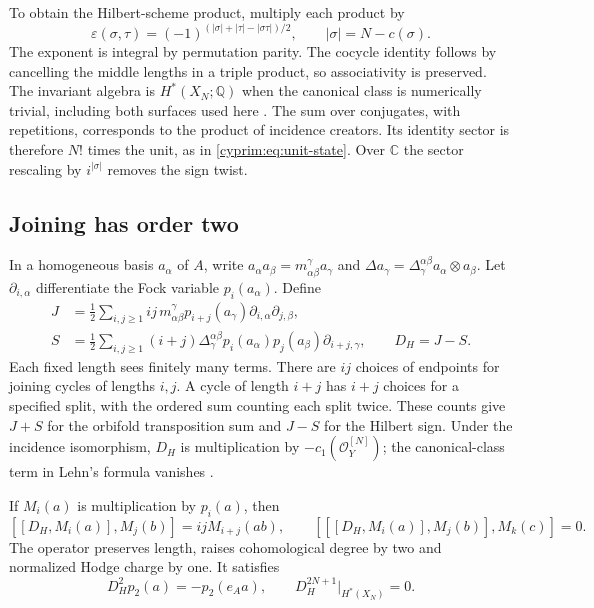 To obtain the Hilbert-scheme product, multiply each product
by
\begin{equation}\label{cyprim:eq:Hilbert-sign}
 \varepsilon(\sigma,\tau)
 =(-1)^{(|\sigma|+|\tau|-|\sigma\tau|)/2},
 \qquad |\sigma|=N-c(\sigma).
\end{equation}
The exponent is integral by permutation parity. The cocycle
identity follows by cancelling the middle lengths in a
triple product, so associativity is preserved.
The invariant algebra is $H^*(X_N;\mathbb Q)$ when the
canonical class is numerically trivial, including both
surfaces used here \cite[Theorem~3.2]{rewriteLS2003}.
The sum over conjugates, with repetitions, corresponds to
the product of incidence creators. Its identity sector is
therefore $N!$ times the unit, as in
\eqref{cyprim:eq:unit-state}. Over $\mathbb C$ the sector
rescaling by $i^{|\sigma|}$ removes the sign twist.

\subsection{Joining has order two}

In a homogeneous basis $a_\alpha$ of $A$, write
$a_\alpha a_\beta=m_{\alpha\beta}^{\gamma}a_\gamma$
and $\Delta a_\gamma=\Delta_\gamma^{\alpha\beta}
a_\alpha\otimes a_\beta$. Let $\partial_{i,\alpha}$
differentiate the Fock variable $p_i(a_\alpha)$. Define
\begin{equation}\label{cyprim:eq:join-split}
\begin{split}
 J&=\frac12\sum_{i,j\ge1}ij\,m_{\alpha\beta}^{\gamma}
       p_{i+j}(a_\gamma)\partial_{i,\alpha}\partial_{j,\beta},\\
 S&=\frac12\sum_{i,j\ge1}(i+j)\Delta_\gamma^{\alpha\beta}
       p_i(a_\alpha)p_j(a_\beta)\partial_{i+j,\gamma},
 \qquad D_H=J-S.
\end{split}
\end{equation}
Each fixed length sees finitely many terms. There are $ij$
choices of endpoints for joining cycles of lengths $i,j$.
A cycle of length $i+j$ has $i+j$ choices for a specified
split, with the ordered sum counting each split twice.
These counts give $J+S$ for the orbifold transposition
sum and $J-S$ for the Hilbert sign. Under the incidence
isomorphism, $D_H$ is multiplication by
$-c_1(\mathcal O_Y^{[N]})$; the canonical-class term in
Lehn's formula vanishes \cite[Theorem~3.10]{rewriteLehn1999}.

\begin{proposition}\label{cyprim:prop:joining}
If $M_i(a)$ is multiplication by $p_i(a)$, then
\[
 [[D_H,M_i(a)],M_j(b)]=ijM_{i+j}(ab),
 \qquad [[[D_H,M_i(a)],M_j(b)],M_k(c)]=0.
\]
The operator preserves length, raises cohomological degree
by two and normalized Hodge charge by one. It satisfies
\[
 D_H^2p_2(a)=-p_2(e_Aa),\qquad
 D_H^{2N+1}|_{H^*(X_N)}=0.
\]
\end{proposition}

